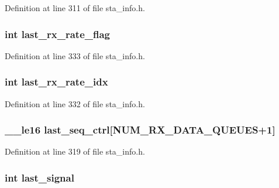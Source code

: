 Definition at line 311 of file sta\-\_\-info.\-h.

\hypertarget{structsta__info_a3ce20e50f9c3e0019984f7fce388ff53}{
\subsubsection[{last\-\_\-rx\-\_\-rate\-\_\-flag}]{\setlength{\rightskip}{0pt plus 5cm}int last\-\_\-rx\-\_\-rate\-\_\-flag}}\label{structsta__info_a3ce20e50f9c3e0019984f7fce388ff53}


Definition at line 333 of file sta\-\_\-info.\-h.

\hypertarget{structsta__info_a91ccafb08a519aa4bd9efdd330b3d6a9}{
\subsubsection[{last\-\_\-rx\-\_\-rate\-\_\-idx}]{\setlength{\rightskip}{0pt plus 5cm}int last\-\_\-rx\-\_\-rate\-\_\-idx}}\label{structsta__info_a91ccafb08a519aa4bd9efdd330b3d6a9}


Definition at line 332 of file sta\-\_\-info.\-h.

\hypertarget{structsta__info_a1068cbcad5e62974b8a3a9e1de889b9f}{
\subsubsection[{last\-\_\-seq\-\_\-ctrl}]{\setlength{\rightskip}{0pt plus 5cm}\-\_\-\-\_\-le16 last\-\_\-seq\-\_\-ctrl\mbox{[}{\bf N\-U\-M\-\_\-\-R\-X\-\_\-\-D\-A\-T\-A\-\_\-\-Q\-U\-E\-U\-E\-S}+1\mbox{]}}}\label{structsta__info_a1068cbcad5e62974b8a3a9e1de889b9f}


Definition at line 319 of file sta\-\_\-info.\-h.

\hypertarget{structsta__info_a1d01d8e411dc32dde1ab25208eab05f8}{
\subsubsection[{last\-\_\-signal}]{\setlength{\rightskip}{0pt plus 5cm}int last\-\_\-signal}}\label{structsta__info_a1d01d8e411dc32dde1ab25208eab05f8}


